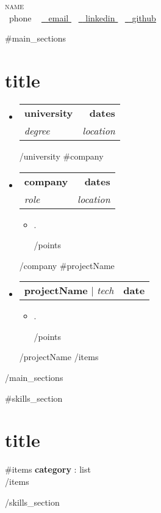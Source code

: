 \documentclass[letterpaper,11pt]{article}
\makeatletter
\newcommand{\resumeItem}[1]{
  \item\small{
    {#1 \vspace{-2pt}}
  }
}
\newcommand{\resumeSubheading}[4]{
  \vspace{-2pt}\item
    \begin{tabular*}{1.0\textwidth}[t]{l@{\extracolsep{\fill}}r}
      \textbf{#1} & \textbf{\small #2} \\
      \textit{\small#3} & \textit{\small #4} \\
    \end{tabular*}\vspace{-7pt}
}
\newcommand{\resumeProjectHeading}[2]{
    \item
    \begin{tabular*}{1.001\textwidth}{l@{\extracolsep{\fill}}r}
      \small#1 & \textbf{\small #2}\\
    \end{tabular*}\vspace{-7pt}
}
\newcommand{\resumeSubHeadingListStart}{\begin{itemize}[leftmargin=0.0in, label={}]}
\newcommand{\resumeSubHeadingListEnd}{\end{itemize}}
\newcommand{\resumeItemListStart}{\begin{itemize}}
\newcommand{\resumeItemListEnd}{\end{itemize}\vspace{-5pt}}
\makeatother
\begin{document}
\begin{center}
    {\Huge \scshape {{{name}}} } \\ \vspace{1pt}
    \small \raisebox{-0.1\height}\faPhone\ {{{phone}}} ~ \href{mailto:{{{email}}}}{\raisebox{-0.2\height}\faEnvelope\  \underline{ {{{email}}} }} ~ 
    \href{https://{{{linkedin}}}}{\raisebox{-0.2\height}\faLinkedin\ \underline{ {{{linkedin}}} }}  ~ 
    \href{https://{{{github}}}}{\raisebox{-0.2\height}\faGithub\ \underline{ {{{github}}} }}
    \vspace{-8pt}
\end{center}

{{#main_sections}}
\section{ {{{title}}} }
\resumeSubHeadingListStart
{{#items}}
{{#university}}
\resumeSubheading
{ {{{university}}} }{ {{{dates}}} }
{ {{{degree}}} }{ {{{location}}} }
{{/university}}
{{#company}}
\resumeSubheading
{ {{{company}}} }{ {{{dates}}} }
{ {{{role}}} }{ {{{location}}} }
\resumeItemListStart
{{#points}}
\resumeItem{ {{{.}}} }
{{/points}}
\resumeItemListEnd
{{/company}}
{{#projectName}}
\resumeProjectHeading
{ \textbf{ {{{projectName}}} } $|$ \emph{ {{{tech}}} } }
{ {{{date}}} }
\resumeItemListStart
{{#points}}
\resumeItem{ {{{.}}} }
{{/points}}
\resumeItemListEnd
{{/projectName}}
{{/items}}
\resumeSubHeadingListEnd
{{/main_sections}}

{{#skills_section}}
\section{ {{{title}}} }
\begin{itemize}[leftmargin=0.15in, label={}]
\small{\item{
{{#items}}
\textbf{ {{{category}}} }{: {{{list}}} } \\
{{/items}}
}}
\end{itemize}
{{/skills_section}}
\end{document}
